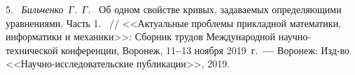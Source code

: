 5.~%
\textit%
{Бильченко~Г.~Г.~}
{%
  {Об  одном  свойстве  кривых,
  задаваемых
  определяющими  уравнениями.
  Часть  1.}%
~/$\!$/
  <<Актуальные  проблемы
  прикладной  математики,  информатики
  и  механики>>:
  Сборник  трудов  Международной
  научно-тех\-ни\-чес\-кой
  конференции,
  Воронеж,
  11{\textbf{--}}13
  ноября  2019~г.~{\textbf{---}}
  Воронеж:
  Изд-во
  <<Научно-исследовательские
  публикации>>,
  2019.%
  }


